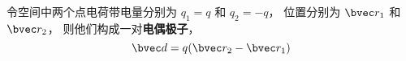 


令空间中两个点电荷带电量分别为 $q_1 = q$ 和 $q_2 = -q$， 位置分别为 $\bvec r_1$ 和 $\bvec r_2$， 则他们构成一对\textbf{电偶极子}，
\begin{equation}
\bvec d = q (\bvec r_2 - \bvec r_1)
\end{equation}
